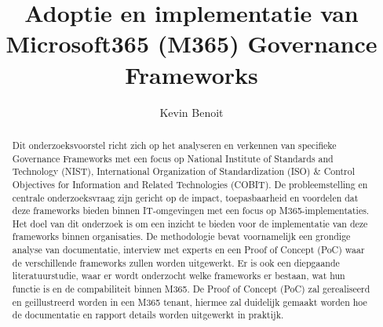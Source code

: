 \documentclass{hogent-article}
\title{Adoptie en implementatie van Microsoft365 (M365) Governance Frameworks}
\author{Kevin Benoit}
\begin{document}
\begin{abstract}
Dit onderzoeksvoorstel richt zich op het analyseren en verkennen van specifieke Governance Frameworks met een focus op National Institute of Standards and Technology (NIST), International Organization of Standardization (ISO) \& Control Objectives for Information and Related Technologies (COBIT). De probleemstelling en centrale onderzoeksvraag zijn gericht op de impact, toepasbaarheid en voordelen dat deze frameworks bieden binnen IT-omgevingen met een focus op M365-implementaties. Het doel van dit onderzoek is om een inzicht te bieden voor de implementatie van deze frameworks binnen organisaties.  De methodologie bevat voornamelijk een grondige analyse van documentatie, interview met experts en een Proof of Concept (PoC) waar de verschillende frameworks zullen worden uitgewerkt. Er is ook een diepgaande literatuurstudie, waar er wordt onderzocht welke frameworks er bestaan, wat hun functie is en de compabiliteit binnen M365.
De Proof of Concept (PoC) zal gerealiseerd en geillustreerd worden in een M365 tenant, hiermee zal duidelijk gemaakt worden hoe de documentatie en rapport details worden uitgewerkt in praktijk.

\end{abstract}

\tableofcontents



\printbibliography[heading=bibintoc]
\end{document}
